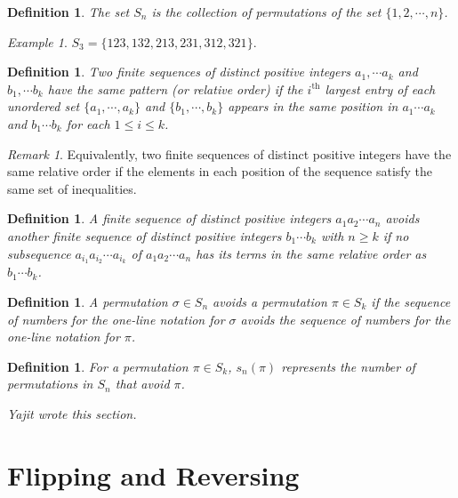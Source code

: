 \documentclass[11pt,letterpaper,twoside,english]{article}
\theoremstyle{theorem}
\newtheorem{definition}[theorem]{Definition}
\theoremstyle{remark}
\newtheorem{remark}[theorem]{Remark}
\newtheorem{example}[theorem]{Example}
\begin{document}
\begin{definition}
The set $S_n$ is the collection of permutations of the set $\{1,2,\cdots, n\}$. 
\end{definition}

\begin{example}
$S_3=\{123,132,213,231,312,321\}$. 
\end{example}








\begin{definition}
Two finite sequences of distinct positive integers $a_1,\cdots a_k$ and $b_1,\cdots b_k$ have the same pattern (or relative order) if the $i^\text{th}$ largest entry of each unordered set $\{a_1,\cdots,a_k\}$ and $\{b_1,\cdots, b_k\}$ appears in the same position in $a_1\cdots a_k$ and $b_1\cdots b_k$ for each $1\le i\le k$. 
\end{definition}

\begin{remark}
Equivalently, two finite sequences of distinct positive integers have the same relative order if the elements in each position of the sequence satisfy the same set of inequalities.
\end{remark}

\begin{definition}
A finite sequence of distinct positive integers $a_1a_2\cdots a_n$ avoids another finite sequence of distinct positive integers $b_1\cdots b_k$ with $n\ge k$ if no subsequence $a_{i_1}a_{i_2}\cdots a_{i_k}$ of $a_1a_2\cdots a_n$ has its terms in the same relative order as $b_1\cdots b_k$. 
\end{definition}


\begin{definition} 
A permutation $\sigma\in S_n$ avoids a permutation $\pi\in S_k$ if the sequence of numbers for the one-line notation for $\sigma$ avoids the sequence of numbers for the one-line notation for $\pi$.
\end{definition}

\begin{definition}
For a permutation $\pi\in S_k$, $s_n(\pi)$ represents the number of permutations in $S_n$ that avoid $\pi$. 
\end{definition}

\emph{Yajit wrote this section. }


\section{Flipping and Reversing}
\end{document}
